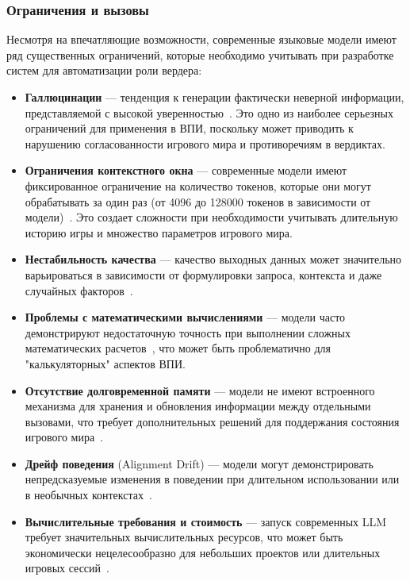 \subsubsection{Ограничения и вызовы}

Несмотря на впечатляющие возможности, современные языковые модели имеют ряд существенных ограничений, которые необходимо учитывать при разработке систем для автоматизации роли вердера:

\begin{itemize}
    \item \textbf{Галлюцинации} — тенденция к генерации фактически неверной информации, представляемой с высокой уверенностью~\cite{ji2023survey}. Это одно из наиболее серьезных ограничений для применения в ВПИ, поскольку может приводить к нарушению согласованности игрового мира и противоречиям в вердиктах.

    \item \textbf{Ограничения контекстного окна} — современные модели имеют фиксированное ограничение на количество токенов, которые они могут обрабатывать за один раз (от 4096 до 128000 токенов в зависимости от модели)~\cite{liu2023lost}. Это создает сложности при необходимости учитывать длительную историю игры и множество параметров игрового мира.

    \item \textbf{Нестабильность качества} — качество выходных данных может значительно варьироваться в зависимости от формулировки запроса, контекста и даже случайных факторов~\cite{zhao2021calibrate}.

    \item \textbf{Проблемы с математическими вычислениями} — модели часто демонстрируют недостаточную точность при выполнении сложных математических расчетов~\cite{patel2021nlp}, что может быть проблематично для "{}калькуляторных"{} аспектов ВПИ.

    \item \textbf{Отсутствие долговременной памяти} — модели не имеют встроенного механизма для хранения и обновления информации между отдельными вызовами, что требует дополнительных решений для поддержания состояния игрового мира~\cite{karpas2022mrkl}.

    \item \textbf{Дрейф поведения} (Alignment Drift) — модели могут демонстрировать непредсказуемые изменения в поведении при длительном использовании или в необычных контекстах~\cite{ouyang2022training}.

    \item \textbf{Вычислительные требования и стоимость} — запуск современных LLM требует значительных вычислительных ресурсов, что может быть экономически нецелесообразно для небольших проектов или длительных игровых сессий~\cite{patterson2021carbon}.
\end{itemize}

